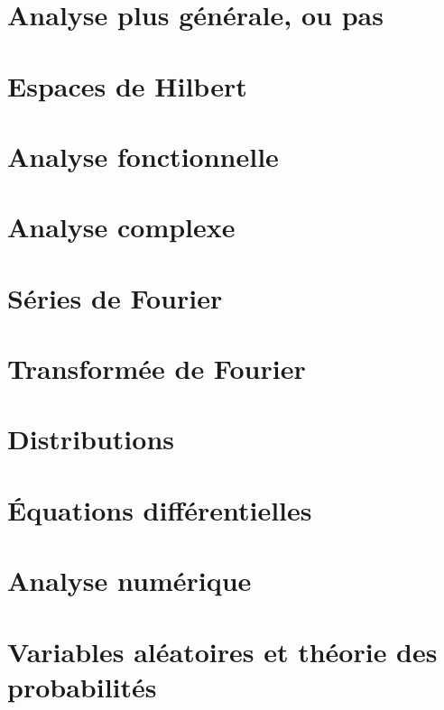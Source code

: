 \chapter{Analyse plus générale, ou pas}




\chapter{Espaces de Hilbert}


\chapter{Analyse fonctionnelle}



\chapter{Analyse complexe}



\chapter{Séries de Fourier}


\chapter{Transformée de Fourier}


\chapter{Distributions}


\chapter{Équations différentielles}


\chapter{Analyse numérique}


\chapter{Variables aléatoires et théorie des probabilités}




